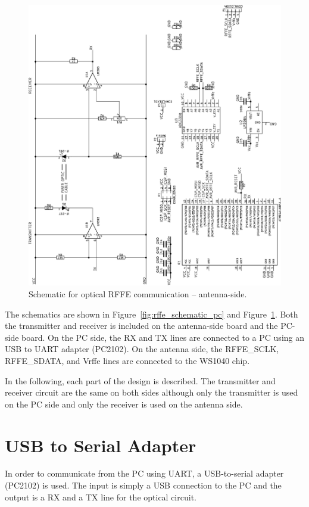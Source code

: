 \begin{figure}[htbp]
    \centering
    \includegraphics[angle=270, width=\linewidth]{img/optical_rffe/schematic_ant}
    \caption{Schematic for optical RFFE communication -- antenna-side.}
    \label{fig:rffe_schematic_ant}
\end{figure}

The schematics are shown in Figure~\ref{fig:rffe_schematic_pc} and Figure~\ref{fig:rffe_schematic_ant}. Both the transmitter and receiver is included on the antenna-side board and the PC-side board. On the PC side, the RX and TX lines are connected to a PC using an USB to UART adapter (PC2102). On the antenna side, the RFFE\_SCLK, RFFE\_SDATA, and Vrffe lines are connected to the WS1040 chip.

In the following, each part of the design is described. The transmitter and receiver circuit are the same on both sides although only the transmitter is used on the PC side and only the receiver is used on the antenna side.

\section{USB to Serial Adapter}
In order to communicate from the PC using UART, a USB-to-serial adapter (PC2102) is used. The input is simply a USB connection to the PC and the output is a RX and a TX line for the optical circuit.

